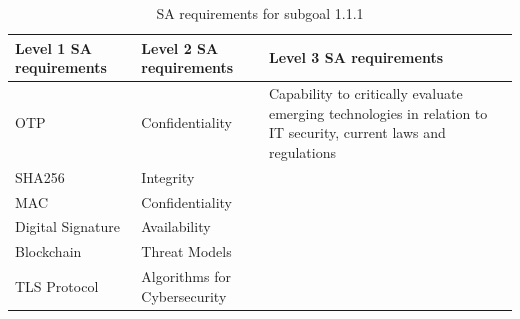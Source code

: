 \begin{table}[H]
    \begin{center}
    \begin{tabular}{ | m{5cm} | m{5cm}| m{5cm} | } 
      \hline
      \textbf{Level 1 SA requirements} & \textbf{Level 2 SA requirements}  & \textbf{Level 3 SA requirements}  \\ 
      \hline
      OTP & Confidentiality & Capability to critically evaluate emerging technologies in relation to IT security, current laws and regulations\\ 
      \hline
      SHA256 & Integrity & \\ 
      \hline
      MAC & Confidentiality & \\ 
      \hline
      Digital Signature & Availability  & \\ 
      \hline
      Blockchain & Threat Models  & \\ 
      \hline
      TLS Protocol & Algorithms for Cybersecurity & \\ 
      \hline
    \end{tabular}
    \end{center}
    \caption{SA requirements for subgoal 1.1.1}
    \end{table}
    
\newpage
